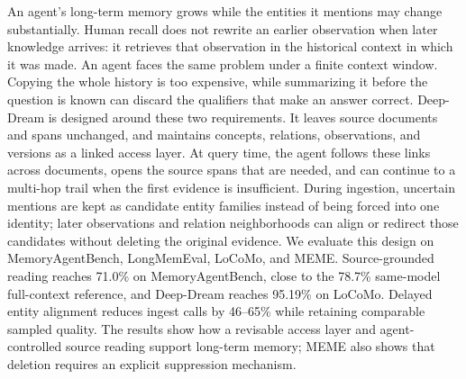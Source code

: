 An agent's long-term memory grows while the entities it mentions may change substantially. Human recall does not rewrite an earlier observation when later knowledge arrives: it retrieves that observation in the historical context in which it was made. An agent faces the same problem under a finite context window. Copying the whole history is too expensive, while summarizing it before the question is known can discard the qualifiers that make an answer correct. Deep-Dream is designed around these two requirements. It leaves source documents and spans unchanged, and maintains concepts, relations, observations, and versions as a linked access layer. At query time, the agent follows these links across documents, opens the source spans that are needed, and can continue to a multi-hop trail when the first evidence is insufficient. During ingestion, uncertain mentions are kept as candidate entity families instead of being forced into one identity; later observations and relation neighborhoods can align or redirect those candidates without deleting the original evidence. We evaluate this design on MemoryAgentBench, LongMemEval, LoCoMo, and MEME. Source-grounded reading reaches 71.0\% on MemoryAgentBench, close to the 78.7\% same-model full-context reference, and Deep-Dream reaches 95.19\% on LoCoMo. Delayed entity alignment reduces ingest calls by 46--65\% while retaining comparable sampled quality. The results show how a revisable access layer and agent-controlled source reading support long-term memory; MEME also shows that deletion requires an explicit suppression mechanism.

